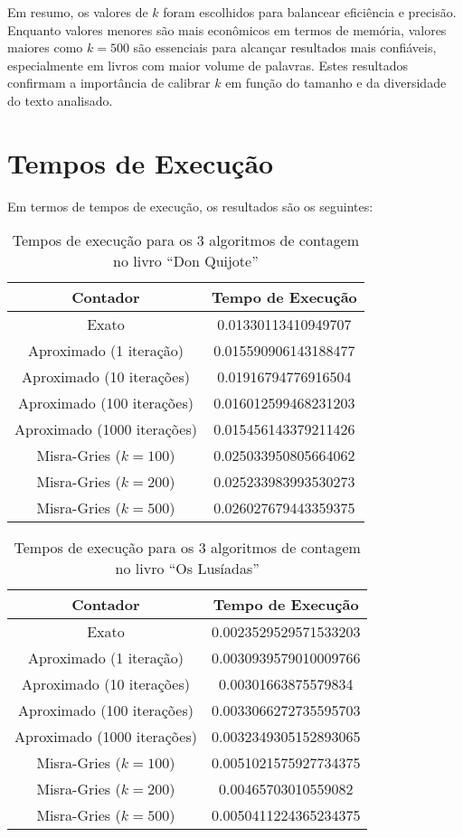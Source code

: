 \documentclass[shortpaper, portugues, times, mirror]{revdetua}
\begin{document}
Em resumo, os valores de \(k\) foram escolhidos para balancear eficiência e precisão. Enquanto valores menores são mais econômicos em termos de memória, valores maiores como \(k = 500\) são essenciais para alcançar resultados mais confiáveis, especialmente em livros com maior volume de palavras. Estes resultados confirmam a importância de calibrar \(k\) em função do tamanho e da diversidade do texto analisado.

\section{Tempos de Execução}

Em termos de tempos de execução, os resultados são os seguintes:

\begin{table}[H]
\centering
\begin{tabular}{|c|c|}
\hline
\textbf{Contador}& \textbf{Tempo de Execução}\\ \hline
Exato& 0.01330113410949707 \\ \hline
Aproximado (1 iteração)& 0.015590906143188477 \\ \hline
Aproximado (10 iterações)& 0.01916794776916504 \\ \hline
Aproximado (100 iterações)& 0.016012599468231203 \\ \hline
Aproximado (1000 iterações)& 0.015456143379211426 \\ \hline
Misra-Gries (\(k = 100\))& 0.025033950805664062 \\ \hline
Misra-Gries (\(k = 200\))& 0.025233983993530273 \\ \hline
Misra-Gries (\(k = 500\))& 0.026027679443359375 \\ \hline
\end{tabular}
\caption{Tempos de execução para os 3 algoritmos de contagem no livro “Don Quijote”}
\label{tab:accuracy}
\end{table}

\begin{table}[H]
\centering
\begin{tabular}{|c|c|}
\hline
\textbf{Contador}& \textbf{Tempo de Execução}\\ \hline
Exato& 0.0023529529571533203 \\ \hline
Aproximado (1 iteração)& 0.0030939579010009766 \\ \hline
Aproximado (10 iterações)& 0.00301663875579834 \\ \hline
Aproximado (100 iterações)& 0.0033066272735595703 \\ \hline
Aproximado (1000 iterações)& 0.0032349305152893065 \\ \hline
Misra-Gries (\(k = 100\))& 0.0051021575927734375 \\ \hline
Misra-Gries (\(k = 200\))& 0.00465703010559082 \\ \hline
Misra-Gries (\(k = 500\))& 0.0050411224365234375 \\ \hline
\end{tabular}
\caption{Tempos de execução para os 3 algoritmos de contagem no livro “Os Lusíadas”}
\label{tab:accuracy}
\end{table}
\end{document}
